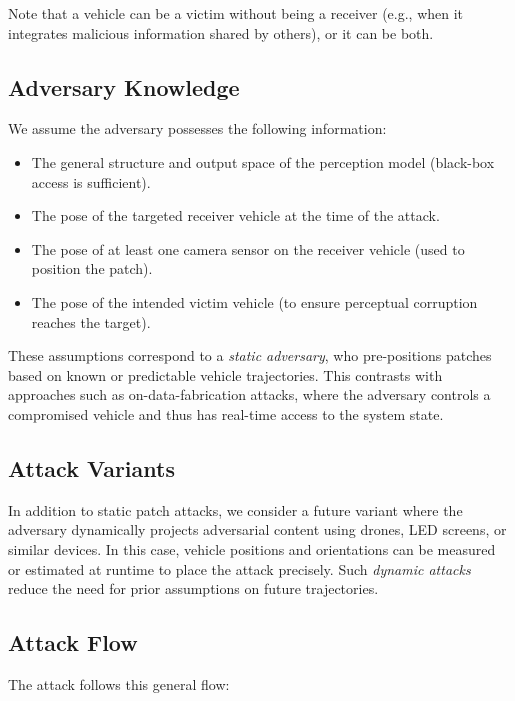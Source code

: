 Note that a vehicle can be a victim without being a receiver (e.g., when it integrates malicious information shared by others), or it can be both.

\subsection{Adversary Knowledge}

We assume the adversary possesses the following information:

\begin{itemize}
    \item The general structure and output space of the perception model (black-box access is sufficient).
    \item The pose of the targeted receiver vehicle at the time of the attack.
    \item The pose of at least one camera sensor on the receiver vehicle (used to position the patch).
    \item The pose of the intended victim vehicle (to ensure perceptual corruption reaches the target).
\end{itemize}

These assumptions correspond to a \textit{static adversary}, who pre-positions patches based on known or predictable vehicle trajectories. This contrasts with approaches such as on-data-fabrication attacks, where the adversary controls a compromised vehicle and thus has real-time access to the system state.

\subsection{Attack Variants}

In addition to static patch attacks, we consider a future variant where the adversary dynamically projects adversarial content using drones, LED screens, or similar devices. In this case, vehicle positions and orientations can be measured or estimated at runtime to place the attack precisely. Such \textit{dynamic attacks} reduce the need for prior assumptions on future trajectories.

\subsection{Attack Flow}

The attack follows this general flow:

